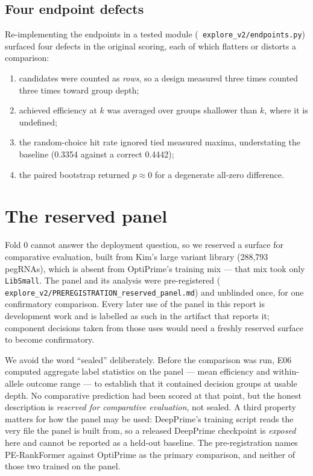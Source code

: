 \documentclass[11pt]{article}
\newcommand{\code}[1]{\texttt{\small\begingroup\hyphenpenalty=10000 #1\endgroup}}
\begin{document}
\subsection{Four endpoint defects}

Re-implementing the endpoints in a tested module (\code{explore\_v2/endpoints.py}) surfaced
four defects in the original scoring, each of which flatters or distorts a comparison:

\begin{enumerate}\itemsep2pt
\item candidates were counted as \emph{rows}, so a design measured three times counted three
times toward group depth;
\item achieved efficiency at $k$ was averaged over groups shallower than $k$, where it is
undefined;
\item the random-choice hit rate ignored tied measured maxima, understating the baseline
(0.3354 against a correct 0.4442);
\item the paired bootstrap returned $p \approx 0$ for a degenerate all-zero difference.
\end{enumerate}

\section{The reserved panel}

Fold 0 cannot answer the deployment question, so we reserved a surface for comparative
evaluation, built from Kim's large variant library (288{,}793 pegRNAs), which is absent from OptiPrime's training mix --- that
mix took only \code{LibSmall}. The panel and its analysis were pre-registered
(\code{explore\_v2/PREREGISTRATION\_reserved\_panel.md}) and unblinded once, for one
confirmatory comparison. Every later use of the panel in this report is development work and
is labelled as such in the artifact that reports it; component decisions taken from those uses
would need a freshly reserved surface to become confirmatory.

We avoid the word ``sealed'' deliberately. Before the comparison was run, E06 computed
aggregate label statistics on the panel --- mean efficiency and within-allele outcome range
--- to establish that it contained decision groups at usable depth. No comparative prediction
had been scored at that point, but the honest description is \emph{reserved for comparative
evaluation}, not sealed. A third property matters for how the panel may be used: DeepPrime's
training script reads the very file the panel is built from, so a released DeepPrime
checkpoint is \emph{exposed} here and cannot be reported as a held-out baseline. The
pre-registration names PE-RankFormer against OptiPrime as the primary comparison, and neither
of those two trained on the panel.
\end{document}
